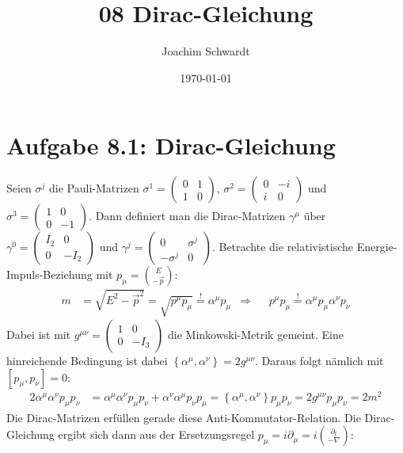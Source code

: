 \documentclass[a4paper,12pt]{article}
\newcommand{\klam}{}
\newcommand{\klammer}{}
\begin{document}
\title{08 Dirac-Gleichung}
\author{Joachim Schwardt}
\date{\today}
\maketitle

\section*{Aufgabe 8.1: Dirac-Gleichung}
Seien $\sigma^j$ die Pauli-Matrizen $\sigma^1=\begin{pmatrix}
0&1\\ 1&0
\end{pmatrix}$, $\sigma^2=\begin{pmatrix}
0&-i\\ i&0
\end{pmatrix}$ und $\sigma^3=\begin{pmatrix}
1&0\\ 0&-1
\end{pmatrix}$. Dann definiert man die Dirac-Matrizen $\gamma^\mu$ über $\gamma^0=\begin{pmatrix}
I_2&0\\ 0&-I_2
\end{pmatrix}$ und $\gamma^j=\begin{pmatrix}
0&\sigma^j\\ -\sigma^j&0
\end{pmatrix}$. Betrachte die relativistische Energie-Impuls-Beziehung mit $p_\mu=\binom{E}{-\vec{p}}$:
\begin{align*}
m&=\sqrt{E^2-\vec{p}^2}=\sqrt{p^\mu p_\mu }\overset{!}{=}\alpha^\mu p_\mu&\Rightarrow &&p^\mu p_\mu\overset{!}{=}\alpha^\mu p_\mu\alpha^\nu p_\nu
\end{align*}
Dabei ist mit $g^{\mu\nu}=\begin{pmatrix}
1&0 \\ 0&-I_3
\end{pmatrix}$ die Minkowski-Metrik gemeint. Eine hinreichende Bedingung ist dabei $\klammer\left\{{\alpha^\mu,\alpha^\nu} \right\}=2g^{\mu\nu}$. Daraus folgt nämlich mit $\klam\left[ {p_\mu, p_\nu} \right]=0$:
\begin{align*}
2\alpha^\mu\alpha^\nu p_\mu p_\nu &=\alpha^\mu\alpha^\nu p_\mu p_\nu + \alpha^\nu\alpha^\mu p_\nu p_\mu=\klammer\left\{{\alpha^\mu,\alpha^\nu} \right\}p_\mu p_\nu=2g^{\mu\nu} p_\mu p_\nu=2m^2
\end{align*}
Die Dirac-Matrizen erfüllen gerade diese Anti-Kommutator-Relation. Die Dirac-Gleichung ergibt sich dann aus der Ersetzungsregel $p_\mu=i\partial_\mu=i\binom{\partial_t}{-\nabla}$:
\end{document}
